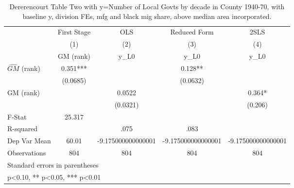 \begin{table}[htbp]\centering
\def\sym#1{\ifmmode^{#1}\else\(^{#1}\)\fi}
\caption{Dererencourt Table Two with y=Number of Local Govts by decade in County 1940-70, with baseline y, division FEs, mfg and black mig share, above median area incorporated.}
\begin{tabular}{l*{4}{c}}
\toprule
                    & First Stage   &         OLS   &Reduced Form   &        2SLS   \\
                    &\multicolumn{1}{c}{(1)}&\multicolumn{1}{c}{(2)}&\multicolumn{1}{c}{(3)}&\multicolumn{1}{c}{(4)}\\
                    &\multicolumn{1}{c}{GM  (rank)}&\multicolumn{1}{c}{y\_L0}&\multicolumn{1}{c}{y\_L0}&\multicolumn{1}{c}{y\_L0}\\
\midrule
$\hat{GM}$ (rank)   &       0.351***&               &       0.128** &               \\
                    &    (0.0685)   &               &    (0.0632)   &               \\
\addlinespace
GM  (rank)          &               &      0.0522   &               &       0.364*  \\
                    &               &    (0.0321)   &               &     (0.206)   \\
\midrule
F-Stat              &      25.317   &               &               &               \\
R-squared           &               &        .075   &        .083   &               \\
Dep Var Mean        &       60.01   &-9.175000000000001   &-9.175000000000001   &-9.175000000000001   \\
Observations        &         804   &         804   &         804   &         804   \\
\bottomrule
\multicolumn{5}{l}{\footnotesize Standard errors in parentheses}\\
\multicolumn{5}{l}{\footnotesize * p<0.10, ** p<0.05, *** p<0.01}\\
\end{tabular}
\end{table}
